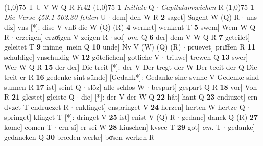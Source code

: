 \documentclass[8pt,a4paper,notitlepage]{article}
\begin{document}
\begin{table}[ht]
\begin{minipage}[t]{0.5\linewidth}
\scriptsize
\line(1,0){75} \newline
T U V W Q R Fr42 \newline
\line(1,0){75} \newline
\textbf{1} \textit{Initiale} Q   $\cdot$ \textit{Capitulumzeichen} R  \newline
\line(1,0){75} \newline
\textbf{1} \textit{Die Verse 453.1-502.30 fehlen} U   $\cdot$ dem] den W R \textbf{2} saget] Sagent W (Q) R  $\cdot$ uns diz] vns [*]: dise V vnß die W (Q) (R) \textbf{4} wenket] wenkent T \textbf{5} swem] Wem W Q R  $\cdot$ erzeigen] erzoͤigen V zeigen R  $\cdot$ sol] \textit{om.} Q \textbf{6} der] dem V W Q R \textbf{7} geteilet] geleitet T \textbf{9} minne] mein Q \textbf{10} unde] Nv V (W) (Q) (R)  $\cdot$ prüevet] pruͯffen R \textbf{11} schuldige] vnschuldig W \textbf{12} götelîchen] gotliche V  $\cdot$ triuwe] trewen Q \textbf{13} swer] Wer W Q R \textbf{15} der der] Die treit [*]: der V Der tregt der W Der teeit der Q Die treit er R \textbf{16} gedenke sint sünde] [Gedank*]: Gedanke sine svnne V Gedenke sind sunnen R \textbf{17} ist] seint Q  $\cdot$ slôz] alle schlos W  $\cdot$ bespart] gespart Q R \textbf{18} vor] Von R \textbf{21} glestet] gleiste Q  $\cdot$ die] [*]: der V der W Q \textbf{22} hât] hant Q \textbf{23} endiuzet] ern dvzet T endruczet R  $\cdot$ enklinget] enspringet V \textbf{24} herzen] herten W hertze Q  $\cdot$ springet] klinget T [*]: dringet V \textbf{25} ist] enist V (Q) R  $\cdot$ gedanc] danck Q (R) \textbf{27} kome] comen T  $\cdot$ ern sî] er sei W \textbf{28} kiuschen] kvsce T \textbf{29} got] \textit{om.} T  $\cdot$ gedanke] gedancken Q \textbf{30} brœden werke] boͯsen werken R \newline
\end{minipage}
\end{table}
\end{document}
